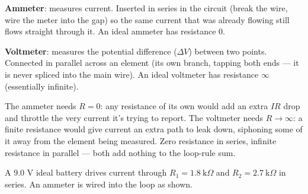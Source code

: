 \documentclass[12pt]{article}
\newcommand{\ANS}[1]{\textcolor{accent}{#1}}
\begin{document}



\textbf{Ammeter}: measures \ANS{current.} Inserted \ANS{in series} in the
circuit (break the wire, wire the meter into the gap) so the same current
that was already flowing still flows straight through it. An ideal ammeter
has resistance \ANS{$0$.}

\vspace{1mm}
\textbf{Voltmeter}: measures the \ANS{potential difference ($\Delta V$)}
between two points. Connected \ANS{in parallel} across an element (its own
branch, tapping both ends --- it is never spliced into the main wire). An
ideal voltmeter has resistance \ANS{$\infty$ (essentially infinite).}


{\small\color{accent} The ammeter needs $R=0$: any resistance of its own
would add an extra $IR$ drop and throttle the very current it's trying to
report. The voltmeter needs $R\to\infty$: a finite resistance would give
current an extra path to leak down, siphoning some of it away from the
element being measured. Zero resistance in series, infinite resistance in
parallel --- both add nothing to the loop-rule sum.}


A $9.0$ V ideal battery drives current through $R_1=1.8\ \text{k}\Omega$
and $R_2=2.7\ \text{k}\Omega$ in series. An ammeter is wired into the loop
as shown.
\end{document}
